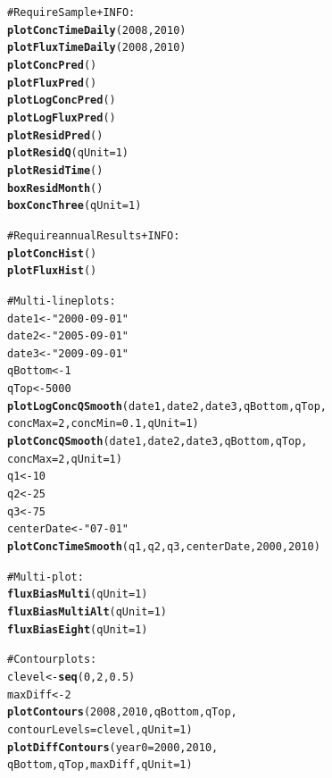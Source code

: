 \documentclass[a4paper,11pt]{article}\usepackage{graphicx, color}
\makeatletter
\newcommand{\hlfunctioncall}[1]{\textcolor[rgb]{0.501960784313725,0,0.329411764705882}{\textbf{#1}}}%
\newcommand{\hlstring}[1]{\textcolor[rgb]{0.6,0.6,1}{#1}}%
\newcommand{\hlcomment}[1]{\textcolor[rgb]{0.180392156862745,0.6,0.341176470588235}{#1}}%
\newenvironment{kframe}{%
 \def\at@end@of@kframe{}%
 \ifinner\ifhmode%
  \def\at@end@of@kframe{\end{minipage}}%
  \begin{minipage}{\columnwidth}%
 \fi\fi%
 \def\FrameCommand##1{\hskip\@totalleftmargin \hskip-\fboxsep
 \colorbox{shadecolor}{##1}\hskip-\fboxsep
     \hskip-\linewidth \hskip-\@totalleftmargin \hskip\columnwidth}%
 \MakeFramed {\advance\hsize-\width
   \@totalleftmargin\z@ \linewidth\hsize
   \@setminipage}}%
 {\par\unskip\endMakeFramed%
 \at@end@of@kframe}
\newenvironment{knitrout}{}{} %
\makeatother
\begin{document}
\begin{knitrout}
\color{fgcolor}\begin{kframe}
\begin{alltt}
\hlcomment{#Require Sample + INFO:}
\hlfunctioncall{plotConcTimeDaily}(2008, 2010)
\hlfunctioncall{plotFluxTimeDaily}(2008, 2010)
\hlfunctioncall{plotConcPred}()
\hlfunctioncall{plotFluxPred}()
\hlfunctioncall{plotLogConcPred}()
\hlfunctioncall{plotLogFluxPred}()
\hlfunctioncall{plotResidPred}()
\hlfunctioncall{plotResidQ}(qUnit=1)
\hlfunctioncall{plotResidTime}()
\hlfunctioncall{boxResidMonth}()
\hlfunctioncall{boxConcThree}(qUnit=1)

\hlcomment{#Require annualResults + INFO:}
\hlfunctioncall{plotConcHist}()
\hlfunctioncall{plotFluxHist}()

\hlcomment{# Multi-line plots:}
date1 <- \hlstring{"2000-09-01"}
date2 <- \hlstring{"2005-09-01"}
date3 <- \hlstring{"2009-09-01"}
qBottom<-1
qTop<-5000
\hlfunctioncall{plotLogConcQSmooth}(date1, date2, date3, qBottom, qTop, 
                   concMax=2, concMin=0.1,qUnit=1)
\hlfunctioncall{plotConcQSmooth}(date1, date2, date3, qBottom, qTop, 
                   concMax=2,qUnit=1)
q1 <- 10
q2 <- 25
q3 <- 75
centerDate <- \hlstring{"07-01"}
\hlfunctioncall{plotConcTimeSmooth}(q1, q2, q3, centerDate, 2000, 2010)

\hlcomment{# Multi-plot:}
\hlfunctioncall{fluxBiasMulti}(qUnit=1)
\hlfunctioncall{fluxBiasMultiAlt}(qUnit=1)
\hlfunctioncall{fluxBiasEight}(qUnit=1)

\hlcomment{#Contour plots:}
clevel<-\hlfunctioncall{seq}(0,2,0.5)
maxDiff<-2
\hlfunctioncall{plotContours}(2008,2010,qBottom,qTop, 
             contourLevels = clevel,qUnit=1)
\hlfunctioncall{plotDiffContours}(year0=2000,2010,
                 qBottom,qTop,maxDiff,qUnit=1)
\end{alltt}
\end{kframe}
\end{knitrout}
\end{document}
